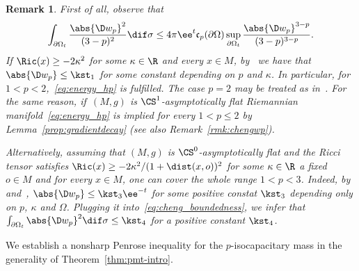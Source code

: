 \documentclass[10pt,a4paper]{amsart}
\numberwithin{equation}{section}
\newtheorem{Remark}[Theorem]{Remark} }
\newcounter{case}
\renewcommand{\ncapa}{\mathfrak{c}}
\begin{document}
\begin{Remark}\label{rmk:geometric_energy}
First of all, observe that
\begin{equation}\label{eq:cheng_boundedness}
 \int_{\partial \Omega_t}\frac{\abs{\D w_p}^2}{(3-p)^2} \dif \sigma \leq 4 \pi \ee^{t}\ncapa_p(\partial \Omega)\sup_{\partial \Omega_t} \frac{\abs{ \D w_p}^{3-p}}{(3-p)^{3-p}}.
\end{equation}
If $\Ric(x) \geq - 2\kappa^2$ for some $\kappa \in \R$ and every $x \in M$, by~\cite[Theorem 1.1]{wang_localgradientestimateharmonic_2010} we have that $\abs{ \D w_p} \leq \kst_1$ for some constant depending on $p$ and $\kappa$. In particular, for $1<p<2$,~\eqref{eq:energy_hp} is fulfilled. The case $p=2$ may be treated as in~\cite[Corollary 1.1]{chan_monotonicitygreenfunctions_2022}. For the same reason, if~$(M,g)$ is $\CS^1$-asymptotically flat Riemannian manifold~\eqref{eq:energy_hp} is implied for every $1<p\leq 2$ by Lemma~\ref{prop:gradientdecay} (see also Remark~\ref{rmk:chengwp}).

Alternatively, assuming that $(M,g)$ is $\CS^0$-asymptotically flat and the Ricci tensor satisfies $\Ric(x) \geq - 2 \kappa^2 /(1+ \dist(x,o))^2$ for some $\kappa \in \R$ a fixed $o\in M$ and for every $x\in M$, one can cover the whole range $1<p<3$. Indeed, by~\cite[Theorem 1.1]{wang_localgradientestimateharmonic_2010} and~\cite [Theorem 1.1]{benatti_asymptoticbehaviourcapacitarypotentials_2022}, $\abs{ \D w_p} \leq \kst_3 \ee^{-t}$ for some positive constat $\kst_3$ depending only on $p$, $\kappa$ and $\Omega$. Plugging it into~\eqref{eq:cheng_boundedness}, we infer that $\int_{\partial \Omega_t} \abs{ \D w_p}^2 \dif \sigma \leq \kst_4$ for a positive constant $\kst_4$.
\end{Remark}
We establish a nonsharp Penrose inequality for the $p$-isocapacitary mass in the generality of Theorem~\ref{thm:pmt-intro}.
\end{document}
